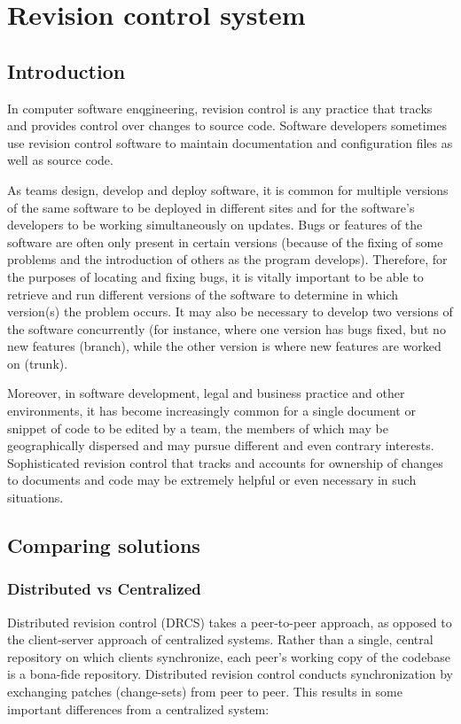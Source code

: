 \section{Revision control system}
\subsection{Introduction}
In computer software enqgineering, revision control is any practice that tracks
and provides control over changes to source code. Software developers sometimes
use revision control software to maintain documentation and configuration files
as well as source code.

As teams design, develop and deploy software, it is common for multiple versions
of the same software to be deployed in different sites and for the software's
developers to be working simultaneously on updates. Bugs or features of the
software are often only present in certain versions (because of the fixing of
some problems and the introduction of others as the program develops). Therefore,
for the purposes of locating and fixing bugs, it is vitally important to be able
to retrieve and run different versions of the software to determine in which
version(s) the problem occurs. It may also be necessary to develop two versions
of the software concurrently (for instance, where one version has bugs fixed, but
no new features (branch), while the other version is where new features are
worked on (trunk).

Moreover, in software development, legal and business practice and other
environments, it has become increasingly common for a single document or snippet
of code to be edited by a team, the members of which may be geographically
dispersed and may pursue different and even contrary interests. Sophisticated
revision control that tracks and accounts for ownership of changes to documents
and code may be extremely helpful or even necessary in such
situations.\cite{rcs:wiki:rcontrol}

\subsection{Comparing solutions}
\subsubsection{Distributed vs Centralized}
Distributed revision control (DRCS) takes a peer-to-peer approach, as opposed to
the client-server approach of centralized systems. Rather than a single, central
repository on which clients synchronize, each peer's working copy of the codebase
is a bona-fide repository. Distributed revision control conducts synchronization
by exchanging patches (change-sets) from peer to peer. This results in some
important differences from a centralized system:

